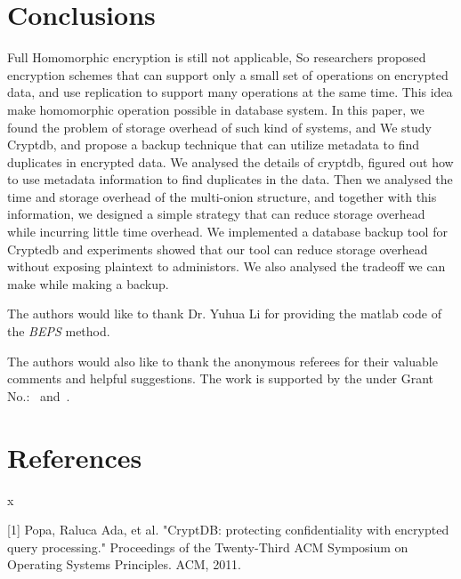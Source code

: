 \section{Conclusions}

Full Homomorphic encryption is still not applicable, So researchers proposed encryption schemes that can support only a small set of operations on encrypted data, and use replication to support many operations at the same time. This idea make homomorphic operation possible in database system. In this paper, we found the problem of storage overhead of such kind of systems, and We study Cryptdb, and propose a backup technique that can utilize metadata to find duplicates in encrypted data. We analysed the details of cryptdb, figured out how to use metadata information to find duplicates in the data. Then we analysed the time and storage overhead of the multi-onion structure, and together with this information, we designed a simple strategy that can reduce storage overhead while incurring little time overhead. We implemented a database backup tool for Cryptedb and experiments showed that our tool can reduce storage overhead without exposing plaintext to administors. We also analysed the tradeoff we can make while making a backup.






\begin{acks}
  The authors would like to thank Dr. Yuhua Li for providing the
  matlab code of  the \textit{BEPS} method. 

  The authors would also like to thank the anonymous referees for
  their valuable comments and helpful suggestions. The work is
  supported by the  under Grant
  No.:~
  and~.

\end{acks}



\section{References}x

[1] Popa, Raluca Ada, et al. "CryptDB: protecting confidentiality with encrypted query processing." Proceedings of the Twenty-Third ACM Symposium on Operating Systems Principles. ACM, 2011.


